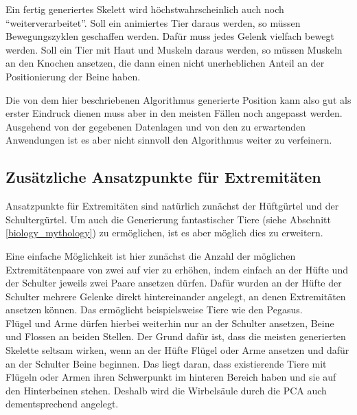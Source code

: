 Ein fertig generiertes Skelett wird höchstwahrscheinlich auch noch "`weiterverarbeitet"'. Soll \zb ein animiertes Tier daraus werden, so müssen Bewegungszyklen geschaffen werden. Dafür muss jedes Gelenk vielfach bewegt werden. Soll ein Tier mit Haut und Muskeln daraus werden, so müssen Muskeln an den Knochen ansetzen, die dann einen nicht unerheblichen Anteil an der Positionierung der Beine haben.

Die von dem hier beschriebenen Algorithmus generierte Position kann also gut als erster Eindruck dienen muss aber in den meisten Fällen noch angepasst werden. Ausgehend von der gegebenen Datenlagen und von den zu erwartenden Anwendungen ist es aber nicht sinnvoll den Algorithmus weiter zu verfeinern.

\subsection{Zusätzliche Ansatzpunkte für Extremitäten}

Ansatzpunkte für Extremitäten sind natürlich zunächst der Hüftgürtel und der Schultergürtel. Um auch die Generierung fantastischer Tiere (siehe Abschnitt \ref{biology_mythology}) zu ermöglichen, ist es aber möglich dies zu erweitern.

Eine einfache Möglichkeit ist hier zunächst die Anzahl der möglichen Extremitätenpaare von zwei auf vier zu erhöhen, indem einfach an der Hüfte und der Schulter jeweils zwei Paare ansetzen dürfen. Dafür wurden an der Hüfte \bzw der Schulter mehrere Gelenke direkt hintereinander angelegt, an denen Extremitäten ansetzen können. Das ermöglicht beispielsweise Tiere wie den Pegasus.\\
Flügel und Arme dürfen hierbei weiterhin nur an der Schulter ansetzen, Beine und Flossen an beiden Stellen. Der Grund dafür ist, dass die meisten generierten Skelette seltsam wirken, wenn an der Hüfte Flügel oder Arme ansetzen und dafür an der Schulter Beine beginnen. Das liegt daran, dass existierende Tiere mit Flügeln oder Armen ihren Schwerpunkt im hinteren Bereich haben und sie auf den Hinterbeinen stehen. Deshalb wird die Wirbelsäule durch die PCA auch dementsprechend angelegt.


